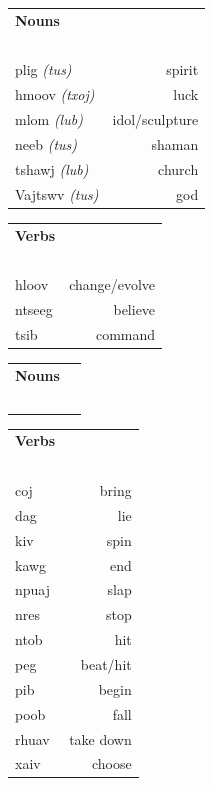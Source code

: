 \documentclass{article}
\begin{document}
\begin{multicols}{2}
[
\section*{}
\begin{center}\rule{\textwidth}{.4pt}\end{center}
]

\begin{tabular}{l r}
\textbf{Nouns} \\
~\\
plig {\em (tus)} &spirit\\
hmoov {\em (txoj)} &luck\\
mlom {\em (lub)} &idol/sculpture\\
neeb {\em (tus)} &shaman\\
tshawj {\em (lub)} &church\\
Vajtswv {\em (tus)} &god\\
\end{tabular}

\begin{tabular}{l r}
\textbf{Verbs} \\
~\\
hloov &change/evolve\\
ntseeg &believe\\
tsib &command\\
\end{tabular}
\end{multicols}

\clearpage

\begin{multicols}{2}
[
\section*{}
\begin{center}\rule{\textwidth}{.4pt}\end{center}
]

\begin{tabular}{l r}
\textbf{Nouns} \\
~\\

\end{tabular}

\begin{tabular}{l r}
\textbf{Verbs} \\
~\\
coj &bring\\
dag &lie\\
kiv &spin\\
kawg &end\\
npuaj &slap\\
nres &stop\\
ntob &hit\\
peg &beat/hit\\
pib &begin\\
poob &fall\\
rhuav &take down\\
xaiv &choose\\
\end{tabular}
\end{multicols}
\end{document}
